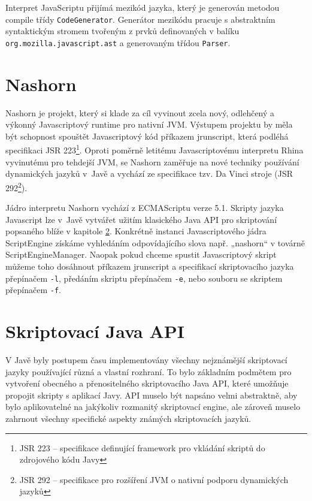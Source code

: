 Interpret JavaScriptu přijímá mezikód jazyka, který je generován metodou compile třídy \texttt{CodeGenerator}. Generátor mezikódu pracuje s abstraktním syntaktickým stromem tvořeným z prvků definovaných v balíku \texttt{org.mozilla.javascript.ast} a generovaným třídou \texttt{Parser}.

\section{Nashorn}
\label{Chapter.JavaScriptInJavaAnalysis.Nashorn}

Nashorn je projekt, který si klade za cíl vyvinout zcela nový, odlehčený a výkonný Javascriptový runtime pro nativní JVM. Výstupem projektu by měla být schopnost spouštět Javascriptový kód příkazem jrunscript, která podléhá specifikaci JSR 223\footnote{JSR 223 -- specifikace definující framework pro vkládání skriptů do zdrojového kódu Javy}. Oproti poměrně letitému Javascriptovému interpretu Rhina vyvinutému pro tehdejší JVM, se Nashorn zaměřuje na nové techniky používání dynamických jazyků v~Javě a vychází ze specifikace tzv. Da Vinci stroje (JSR 292\footnote{JSR 292 -- specifikace pro rozšíření JVM o nativní podporu dynamických jazyků}). \cite{Bibliography.Nashorn.Project}

Jádro interpretu Nashorn vychází z ECMAScriptu verze 5.1. Skripty jazyka Javascript lze v~Javě vytvářet užitím klasického Java API pro skriptování popsaného blíže v kapitole \ref{Chapter.JavaScriptInJavaAnalysis.ScriptingJavaAPI}. Konkrétně instanci Javascriptového jádra ScriptEngine získáme vyhledáním odpovídajícího slova např. „nashorn“ v továrně ScriptEngineManager. Naopak pokud chceme spustit Javascriptový skript můžeme toho dosáhnout příkazem jrunscript a specifikací skriptovacího jazyka přepínačem \texttt{-l}, předáním skriptu přepínačem \texttt{-e}, nebo souboru se skriptem přepínačem \texttt{-f}.

\section{Skriptovací Java API}
\label{Chapter.JavaScriptInJavaAnalysis.ScriptingJavaAPI}

V Javě byly postupem času implementovány všechny nejznámější skriptovací jazyky používající různá a vlastní rozhraní. To bylo základním podmětem pro vytvoření obecného a přenositelného skriptovacího Java API, které umožňuje propojit skripty s aplikací Javy. API muselo být napsáno velmi abstraktně, aby bylo aplikovatelné na jakýkoliv rozmanitý skriptovací engine, ale zároveň muselo zahrnout všechny specifické aspekty známých skriptovacích jazyků. \cite{Bibliography.JavaAPI.Script.Book}

